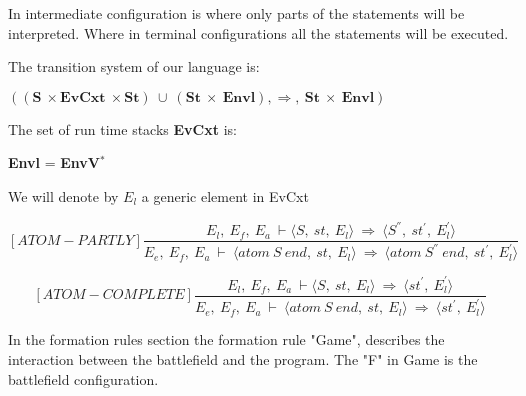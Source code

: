 	
	
	
	
	In intermediate configuration is where only parts of the statements will be interpreted. Where in terminal configurations all the statements will be executed.
	
	
	
	
	
	The transition system of our language is:
	
	
	
	
	
	\begin{math}		
		((\boldsymbol{S} \ \times \boldsymbol{EvCxt} \ \times \boldsymbol{St}) \ \cup \ (\boldsymbol{St} \ \times \ \boldsymbol{Envl}), \Rightarrow, \ \boldsymbol{St} \ \times \ \boldsymbol{Envl})		
	\end{math}
	
	
	
	
	
	The set of run time stacks \textbf{EvCxt} is:
	
	
	
	
	
	\textbf{Envl} = \textbf{EnvV}\begin{math}		
		^*		
	\end{math}
	
	
	
	
	
	We will denote by \begin{math} E_l \end{math} a generic element in EvCxt
	
	
	
	
	
	\[	
	[ATOM-PARTLY]	
	\dfrac{E_l, \ E_f, \ E_a \ \vdash \langle S, \ st, \ E_l \rangle \ \Rightarrow \ \langle S^{''}, \ st^{'}, \ E_l^{'} \rangle}{E_e, \ E_f, \ E_a \ \vdash \ \langle atom \ S \ end, \ st, \ E_l \rangle \ \Rightarrow \ \langle atom \ S^{''} \ end, \ st^{'}, \ E_l^{'} \rangle}	
	\]
	
	
	
	
	
	\[	
	[ATOM-COMPLETE]	
	\dfrac{E_l, \ E_f, \ E_a \ \vdash \langle S, \ st, \ E_l \rangle \ \Rightarrow \ \langle st^{'}, \ E_l^{'} \rangle}{E_e, \ E_f, \ E_a \ \vdash \ \langle atom \ S \ end, \ st, \ E_l \rangle \ \Rightarrow \ \langle st^{'}, \ E_l^{'} \rangle}	
	\]
	
	
	
	
	
	In the formation rules section the formation rule "Game", describes the interaction between the battlefield and the program. The "F" in Game is the battlefield configuration. 
	
